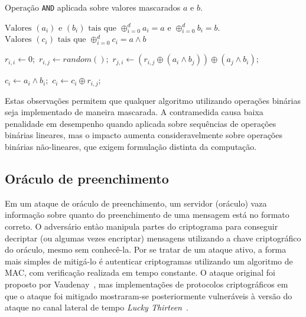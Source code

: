 \documentclass{SBCbookchapter}
\begin{document}
\begin{algorithm}[H]
\caption{Operação \texttt{AND} aplicada sobre valores mascarados $a$ e $b$.}\label{alg:and}
\begin{algorithmic}[1]
        \REQUIRE $\text{Valores }(a_i) \text{ e } (b_i) \text{ tais que } \oplus_{i=0}^da_i = a  \text{ e }  \oplus_{i=0}^db_i = b \text{.} $
        \ENSURE $\text{Valores }(c_i) \text{ tais que } \oplus_{i=0}^dc_i = a \wedge b$
        
                \STATE  $r_{i,i}\gets 0;$
                        \STATE $r_{i,j}\gets random( );$
                        \STATE $r_{j,i}\gets (r_{i,j} \oplus (a_i \wedge b_j)) \oplus (a_j \wedge b_i); $
                \ENDFOR
        \ENDFOR
        
                \STATE  $c_i \gets a_i \wedge b_i;$
                        \STATE $c_i \gets c_i \oplus r_{i,j};$
                \ENDFOR
        \ENDFOR
\end{algorithmic}
\end{algorithm}

Estas observações permitem que qualquer algoritmo utilizando operações binárias seja implementado de maneira mascarada.
A contramedida causa baixa penalidade em desempenho quando aplicada sobre sequências de operações binárias lineares, mas o impacto aumenta consideravelmente sobre operações binárias não-lineares, que exigem formulação distinta da computação.

\subsection{Oráculo de preenchimento}

Em um ataque de oráculo de preenchimento, um servidor (oráculo) vaza informação sobre quanto do preenchimento de uma mensagem está no formato correto.
O adversário entào manipula partes do criptograma para conseguir decriptar (ou algumas vezes encriptar) mensagens utilizando a chave criptográfico do oráculo, mesmo sem conhecê-la. Por se tratar de um ataque ativo, a forma mais simples de mitigá-lo é autenticar criptogramas utilizando um algoritmo de MAC, com verificação realizada em tempo constante. O ataque original foi proposto por Vaudenay~\cite{Vaudenay02}, mas implementações de protocolos criptográficos em que o ataque foi mitigado mostraram-se posteriormente vulneráveis à versão do ataque no canal lateral de tempo \emph{Lucky Thirteen}~\cite{AlFardanP13}.
\end{document}
